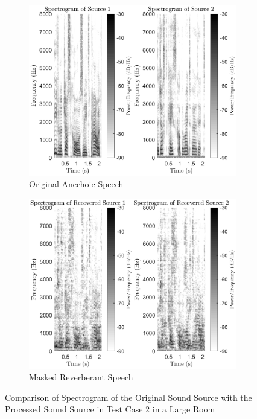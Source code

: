 \documentclass[a4paper,twoside,12pt,hidelinks]{article}
\begin{document}
\begin{figure}[H]
\centering	
\begin{subfigure}[H]{0.45\textwidth}
\includegraphics[width=\textwidth]{spectsrc}
\caption{Original Anechoic Speech}
\end{subfigure}
\begin{subfigure}[H]{0.45\textwidth}
\includegraphics[width=\textwidth]{spectproc}
\caption{Masked Reverberant Speech}
\label{fig:masked}
\end{subfigure}
\caption{Comparison of Spectrogram of the Original Sound Source with the Processed Sound Source in Test Case 2 in a Large Room}
\label{fig:speccomp}
\end{figure}
\end{document}

